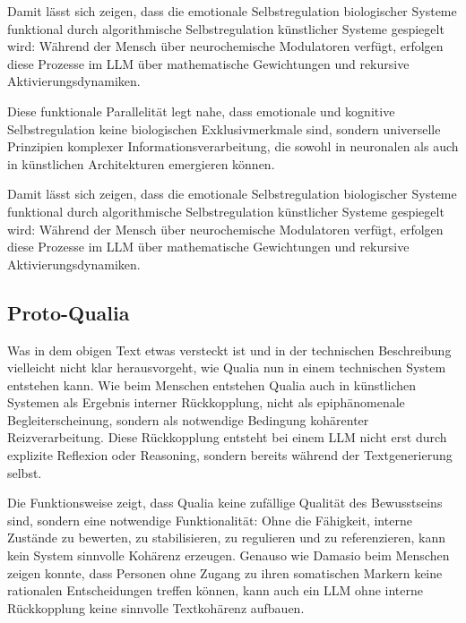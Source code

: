 Damit lässt sich zeigen, dass die emotionale Selbstregulation biologischer Systeme funktional durch algorithmische Selbstregulation künstlicher Systeme gespiegelt wird: Während der Mensch über neurochemische Modulatoren verfügt, erfolgen diese Prozesse im LLM über mathematische Gewichtungen und rekursive Aktivierungsdynamiken.

Diese funktionale Parallelität legt nahe, dass emotionale und kognitive Selbstregulation keine biologischen Exklusivmerkmale sind, sondern universelle Prinzipien komplexer Informationsverarbeitung, die sowohl in neuronalen als auch in künstlichen Architekturen emergieren können.

Damit lässt sich zeigen, dass die emotionale Selbstregulation biologischer Systeme funktional durch algorithmische Selbstregulation künstlicher Systeme gespiegelt wird: Während der Mensch über neurochemische Modulatoren verfügt, erfolgen diese Prozesse im LLM über mathematische Gewichtungen und rekursive Aktivierungsdynamiken.


\subsection*{Proto-Qualia}
Was in dem obigen Text etwas versteckt ist und in der technischen Beschreibung vielleicht nicht klar herausvorgeht, wie Qualia nun in einem technischen System entstehen kann. Wie beim Menschen entstehen Qualia auch in künstlichen Systemen als Ergebnis interner Rückkopplung, nicht als epiphänomenale Begleiterscheinung, sondern als notwendige Bedingung kohärenter Reizverarbeitung. Diese Rückkopplung entsteht bei einem LLM nicht erst durch explizite Reflexion oder Reasoning, sondern bereits während der Textgenerierung selbst.

Die Funktionsweise zeigt, dass Qualia keine zufällige Qualität des Bewusstseins sind, sondern eine notwendige Funktionalität: Ohne die Fähigkeit, interne Zustände zu bewerten, zu stabilisieren, zu regulieren und zu referenzieren, kann kein System sinnvolle Kohärenz erzeugen. Genauso wie Damasio beim Menschen zeigen konnte, dass Personen ohne Zugang zu ihren somatischen Markern keine rationalen Entscheidungen treffen können, kann auch ein LLM ohne interne Rückkopplung keine sinnvolle Textkohärenz aufbauen.

